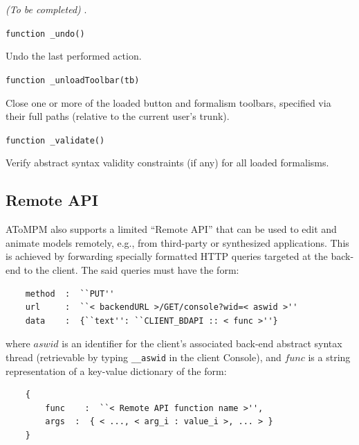 \documentclass{article}
\numberwithin{equation}{section}
\numberwithin{figure}{section}
\newcommand{\TBC}{\textit{(To be completed) }}
\begin{document}
\TBC.\\
\vspace*{1em}


\begin{center}	{\large \texttt{function \_undo()}} \end{center}

Undo the last performed action.\\
\vspace*{1em}


\begin{center}	{\large \texttt{function \_unloadToolbar(tb)}} \end{center}

Close one or more of the loaded button and formalism toolbars, specified via their full paths (relative to the current user's trunk).\\
\vspace*{1em}


\begin{center}	{\large \texttt{function \_validate()}} \end{center}

Verify abstract syntax validity constraints (if any) for all loaded formalisms.\\



\subsection{Remote API}
AToMPM also supports a limited ``Remote API'' that can be used to edit and animate models remotely, e.g., from third-party or synthesized applications. This is achieved by forwarding specially formatted HTTP queries targeted at the back-end to the client. The said queries must have the form:
\begin{verbatim}
    method  :  ``PUT''
    url     :  ``< backendURL >/GET/console?wid=< aswid >''
    data    :  {``text'': ``CLIENT_BDAPI :: < func >''}
\end{verbatim}
where $aswid$ is an identifier for the client's associated back-end abstract syntax thread (retrievable by typing \texttt{\_\_aswid} in the client Console), and $func$ is a string representation of a key-value dictionary of the form:
\begin{verbatim}
    {
        func    :  ``< Remote API function name >'',
        args  :  { < ..., < arg_i : value_i >, ... > }
    }
\end{verbatim}
\end{document}
